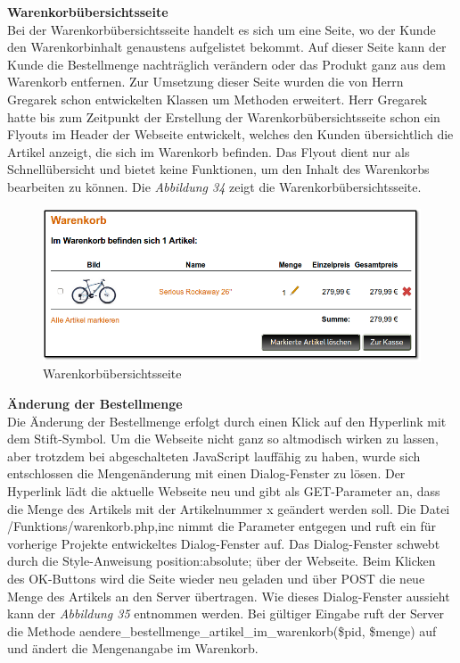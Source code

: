 \textbf{Warenkorbübersichtsseite}\\
Bei der Warenkorbübersichtsseite handelt es sich um eine Seite, wo der Kunde den Warenkorbinhalt genaustens aufgelistet bekommt. Auf dieser Seite kann der Kunde die Bestellmenge nachträglich verändern oder das Produkt ganz aus dem Warenkorb entfernen.
Zur Umsetzung dieser Seite wurden die von Herrn Gregarek schon entwickelten Klassen um Methoden erweitert. Herr Gregarek hatte bis zum Zeitpunkt der Erstellung der Warenkorbübersichtsseite schon ein Flyouts im Header der Webseite entwickelt, welches den Kunden übersichtlich die Artikel anzeigt, die sich im Warenkorb befinden. Das Flyout dient nur als Schnellübersicht und bietet keine Funktionen, um den Inhalt des Warenkorbs bearbeiten zu können. Die \textit{Abbildung 34} zeigt die Warenkorbübersichtsseite.

\begin{figure}[H]
	\begin{center}
			\includegraphics[width=130mm]{Bilder/warenkorb.png}
	\end{center}
	\caption{Warenkorbübersichtsseite}
\end{figure}

\textbf{Änderung der Bestellmenge}\\
Die Änderung der Bestellmenge erfolgt durch einen Klick auf den Hyperlink mit dem Stift-Symbol. Um die Webseite nicht ganz so altmodisch wirken zu lassen, aber trotzdem bei abgeschalteten JavaScript lauffähig zu haben, wurde sich entschlossen die Mengenänderung mit einen Dialog-Fenster zu lösen. Der Hyperlink lädt die aktuelle Webseite neu und gibt als \glqq GET-Parameter\grqq{} an, dass die Menge des Artikels mit der Artikelnummer x geändert werden soll. Die Datei \glqq /Funktions/warenkorb.php,inc\grqq{} nimmt die Parameter entgegen und ruft ein für vorherige Projekte entwickeltes Dialog-Fenster auf. Das Dialog-Fenster schwebt durch die Style-Anweisung \glqq position:absolute;\grqq{} über der  Webseite. Beim Klicken des \glqq OK\grqq{}-Buttons wird die Seite wieder neu geladen und über \glqq POST\grqq{} die neue Menge des Artikels an den Server übertragen. Wie dieses Dialog-Fenster aussieht kann der \textit{Abbildung 35} entnommen werden. Bei gültiger Eingabe ruft der Server die Methode \glqq aendere\_bestellmenge\_artikel\_im\_warenkorb(\$pid, \$menge)\grqq{} auf und ändert die Mengenangabe im Warenkorb.

